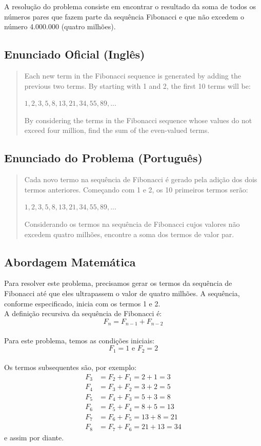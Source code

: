 
A resolução do problema consiste em encontrar o resultado da soma de todos os números pares que fazem parte da sequência Fibonacci e que não excedem o número 4.000.000 (quatro milhões).

\subsection*{Enunciado Oficial (Inglês)}
\begin{quote}
Each new term in the Fibonacci sequence is generated by adding the previous two terms. By starting with 1 and 2, the first 10 terms will be:

$1, 2, 3, 5, 8, 13, 21, 34, 55, 89, ...$

By considering the terms in the Fibonacci sequence whose values do not exceed four million, find the sum of the even-valued terms.
\end{quote}

\subsection*{Enunciado do Problema (Português)}
\begin{quote}
Cada novo termo na sequência de Fibonacci é gerado pela adição dos dois termos anteriores. Começando com 1 e 2, os 10 primeiros termos serão:

$1, 2, 3, 5, 8, 13, 21, 34, 55, 89, ...$

Considerando os termos na sequência de Fibonacci cujos valores não excedem quatro milhões, encontre a soma dos termos de valor par.
\end{quote}

\subsection*{Abordagem Matemática}
Para resolver este problema, precisamos gerar os termos da sequência de Fibonacci até que eles ultrapassem o valor de quatro milhões. A sequência, conforme especificado, inicia com os termos 1 e 2.
\\A definição recursiva da sequência de Fibonacci é:
\[
\boxed{F_n = F_{n-1} + F_{n-2}}
\]
\\Para este problema, temos as condições iniciais:
\[
\boxed{F_1 = 1} \text{ e } \boxed{F_2 = 2}
\]
\\Os termos subsequentes são, por exemplo:
\begin{align*}
F_3 &= F_2 + F_1 = 2 + 1 = 3 \\
F_4 &= F_3 + F_2 = 3 + 2 = 5 \\
F_5 &= F_4 + F_3 = 5 + 3 = 8 \\
F_6 &= F_5 + F_4 = 8 + 5 = 13 \\
F_7 &= F_6 + F_5 = 13 + 8 = 21 \\
F_8 &= F_7 + F_6 = 21 + 13 = 34
\end{align*}
e assim por diante.

